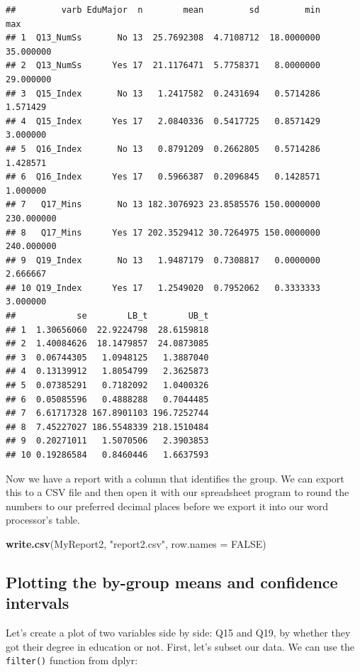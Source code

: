 \documentclass[
]{article}
\newenvironment{Shaded}{\begin{snugshade}}{\end{snugshade}}
\newcommand{\DataTypeTok}[1]{\textcolor[rgb]{0.13,0.29,0.53}{#1}}
\newcommand{\KeywordTok}[1]{\textcolor[rgb]{0.13,0.29,0.53}{\textbf{#1}}}
\newcommand{\NormalTok}[1]{#1}
\newcommand{\OtherTok}[1]{\textcolor[rgb]{0.56,0.35,0.01}{#1}}
\newcommand{\StringTok}[1]{\textcolor[rgb]{0.31,0.60,0.02}{#1}}
\begin{document}
\begin{verbatim}
##         varb EduMajor  n        mean         sd         min        max
## 1  Q13_NumSs       No 13  25.7692308  4.7108712  18.0000000  35.000000
## 2  Q13_NumSs      Yes 17  21.1176471  5.7758371   8.0000000  29.000000
## 3  Q15_Index       No 13   1.2417582  0.2431694   0.5714286   1.571429
## 4  Q15_Index      Yes 17   2.0840336  0.5417725   0.8571429   3.000000
## 5  Q16_Index       No 13   0.8791209  0.2662805   0.5714286   1.428571
## 6  Q16_Index      Yes 17   0.5966387  0.2096845   0.1428571   1.000000
## 7   Q17_Mins       No 13 182.3076923 23.8585576 150.0000000 230.000000
## 8   Q17_Mins      Yes 17 202.3529412 30.7264975 150.0000000 240.000000
## 9  Q19_Index       No 13   1.9487179  0.7308817   0.0000000   2.666667
## 10 Q19_Index      Yes 17   1.2549020  0.7952062   0.3333333   3.000000
##            se        LB_t        UB_t
## 1  1.30656060  22.9224798  28.6159818
## 2  1.40084626  18.1479857  24.0873085
## 3  0.06744305   1.0948125   1.3887040
## 4  0.13139912   1.8054799   2.3625873
## 5  0.07385291   0.7182092   1.0400326
## 6  0.05085596   0.4888288   0.7044485
## 7  6.61717328 167.8901103 196.7252744
## 8  7.45227027 186.5548339 218.1510484
## 9  0.20271011   1.5070506   2.3903853
## 10 0.19286584   0.8460446   1.6637593
\end{verbatim}

Now we have a report with a column that identifies the group. We can export this to a CSV file and then open it with our spreadsheet program to round the numbers to our preferred decimal places before we export it into our word processor's table.

\begin{Shaded}
\begin{Highlighting}[]
\KeywordTok{write.csv}\NormalTok{(MyReport2, }\StringTok{"report2.csv"}\NormalTok{, }\DataTypeTok{row.names =} \OtherTok{FALSE}\NormalTok{)}
\end{Highlighting}
\end{Shaded}

\hypertarget{plotting-the-by-group-means-and-confidence-intervals}{%
\subsection{Plotting the by-group means and confidence intervals}\label{plotting-the-by-group-means-and-confidence-intervals}}

Let's create a plot of two variables side by side: Q15 and Q19, by whether they got their degree in education or not. First, let's subset our data. We can use the \texttt{filter()} function from dplyr:
\end{document}
